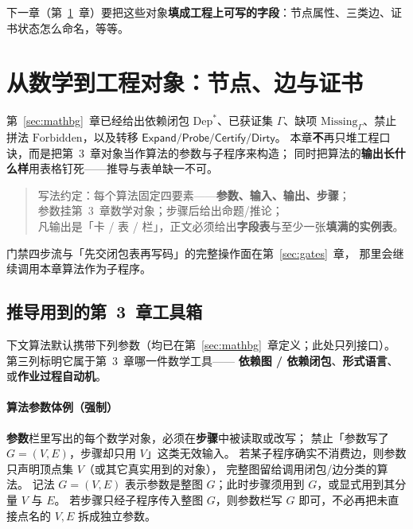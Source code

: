 \documentclass[UTF8,a4paper,11pt]{ctexart}
\theoremstyle{definition}
\theoremstyle{plain}
\theoremstyle{remark}
\numberwithin{figure}{section}
\numberwithin{table}{section}
\begin{document}
下一章（第~\ref{sec:math}~章）要把这些对象\textbf{填成工程上可写的字段}：节点属性、三类边、证书状态怎么命名，等等。

\section{从数学到工程对象：节点、边与证书}
\label{sec:math}

第~\ref{sec:mathbg}~章已经给出依赖闭包 $\mathrm{Dep}^*$、已获证集 $\Gamma$、缺项
$\mathrm{Missing}_\Gamma$、禁止拼法 $\mathrm{Forbidden}$，以及转移
$\mathsf{Expand}/\mathsf{Probe}/\mathsf{Certify}/\mathsf{Dirty}$。
本章\textbf{不}再只堆工程口诀，而是把第~3~章对象当作算法的参数与子程序来构造；
同时把算法的\textbf{输出长什么样}用表格钉死——推导与表单缺一不可。

\begin{quote}
\noindent
写法约定：每个算法固定四要素——\textbf{参数、输入、输出、步骤}；\\
参数挂第~3~章数学对象；步骤后给出命题/推论；\\
凡输出是「卡 / 表 / 栏」，正文必须给出\textbf{字段表}与至少一张\textbf{填满的实例表}。
\end{quote}

门禁四步流与「先交闭包表再写码」的完整操作面在第~\ref{sec:gates}~章，
那里会继续调用本章算法作为子程序。

\subsection{推导用到的第~3~章工具箱}
\label{sec:math-toolbox}

下文算法默认携带下列参数（均已在第~\ref{sec:mathbg}~章定义；此处只列接口）。
第三列标明它属于第~3~章哪一件数学工具——
\textbf{依赖图 / 依赖闭包}、\textbf{形式语言}、或\textbf{作业过程自动机}。

\paragraph{算法参数体例（强制）}
\textbf{参数}栏里写出的每个数学对象，必须在\textbf{步骤}中被读取或改写；
禁止「参数写了 $G=(V,E)$，步骤却只用 $V$」这类无效输入。
若某子程序确实不消费边，则参数只声明顶点集 $V$（或其它真实用到的对象），
完整图留给调用闭包/边分类的算法。
记法 $G=(V,E)$ 表示参数是整图 $G$；此时步骤须用到 $G$，或显式用到其分量 $V$ 与 $E$。
若步骤只经子程序传入整图 $G$，则参数栏写 $G$ 即可，不必再把未直接点名的 $V,E$ 拆成独立参数。
\end{document}
